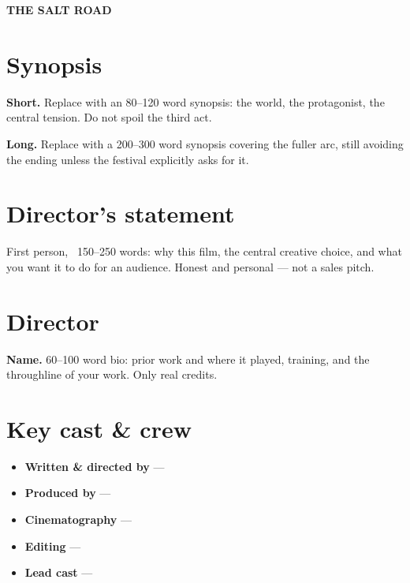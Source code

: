 \documentclass[11pt,a4paper]{article}
\newcommand{\filmtitle}{THE SALT ROAD}
\newcommand{\filmlogline}{A teenage smuggler inherits her estranged father's debt --- and the
desert route that comes with it.}
\begin{document}
{\fontsize{30}{32}\selectfont\bfseries \filmtitle}\par
\vspace{0.2em}{\color{accent}\rule{4cm}{2.5pt}}\par
\vspace{0.6em}{\large\itshape \filmlogline}\par
{}\par

\section*{}
\section{Synopsis}
\textbf{Short.} Replace with an 80--120 word synopsis: the world, the protagonist, the central
tension. Do not spoil the third act.

\medskip
\textbf{Long.} Replace with a 200--300 word synopsis covering the fuller arc, still avoiding the
ending unless the festival explicitly asks for it.

\section{Director's statement}
First person, ~150--250 words: why this film, the central creative choice, and what you want it to
do for an audience. Honest and personal --- not a sales pitch.

\section{Director}
\textbf{Name.} 60--100 word bio: prior work and where it played, training, and the throughline of
your work. Only real credits.

\section{Key cast \& crew}
\begin{itemize}[leftmargin=1.2em,nosep]
  \item \textbf{Written \& directed by} ---
  \item \textbf{Produced by} ---
  \item \textbf{Cinematography} ---
  \item \textbf{Editing} ---
  \item \textbf{Lead cast} ---
\end{itemize}
\end{document}
